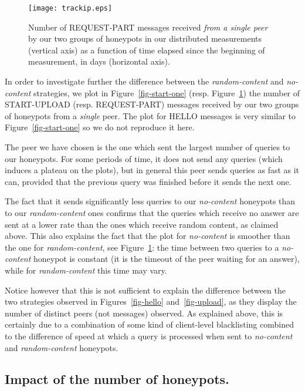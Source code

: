\documentclass[final,
notitlepage,
narroweqnarray,
	inline,
	twoside,
]{ieee}
\begin{document}
\begin{figure}[h!]
  \centering
  \texttt{[image: trackip.eps]}
  \caption{Number of REQUEST-PART messages received {\em from a single
      peer} by our two groups of honeypots  in our distributed measurements (vertical axis) as a
    function of time elapsed since the beginning of measurement, in
    days (horizontal axis).}
  \label{fig-part-one}
\end{figure}

In order to investigate further the difference between the {\em
  random-content} and {\em no-content} strategies, we plot in
Figure~\ref{fig-start-one} (resp. Figure~\ref{fig-part-one}) the
number of START-UPLOAD (resp. REQUEST-PART) messages received by our
two groups of honeypots from a {\em single} peer. The plot for HELLO
messages is very similar to Figure~\ref{fig-start-one} so we do not
reproduce it here.

The peer we have chosen is the one which sent the largest number of queries to our honeypots. For some periods of time, it does not send any queries (which induces a plateau on the plots), but in general this peer sends queries as fast as it can, provided that the previous query was finished before it sends the next one.

The fact that it sends significantly less queries to our {\em no-content} honeypots than to our {\em random-content} ones confirms that the queries which receive no answer are sent at a lower rate than the ones which receive random content, as claimed above. This also explains the fact that the plot for {\em no-content} is smoother than the one for {\em random-content}, see Figure~\ref{fig-part-one}: the time between two queries to a {\em no-content} honeypot is constant (it is the timeout of the peer waiting for an answer), while for {\em random-content} this time may vary.

Notice however that this is not sufficient to explain the difference between the two strategies observed in Figures~\ref{fig-hello} and~\ref{fig-upload}, as they display the number of distinct peers (not messages) observed. As explained above, this is certainly due to a combination of some kind of client-level blacklisting combined to the difference of speed at which a query is processed when sent to {\em no-content} and {\em random-content} honeypots.

\subsection{Impact of the number of honeypots.}
\label{sec-nbhoneypots}
\end{document}
